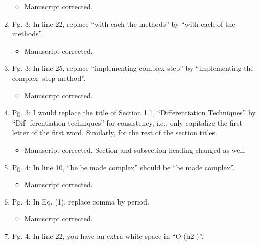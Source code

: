 \documentclass{article}
\begin{document}
\begin{enumerate}
{\color{red}  
\begin{itemize}
     \item
    Manuscript corrected.
  \end{itemize}}

 \item Pg. 3: In line 22, replace “with each the methods” by “with each of the methods”.

{\color{red}  
\begin{itemize}
     \item
 Manuscript corrected. 
  \end{itemize}}

 \item Pg. 3: In line 25, replace “implementing complex-step” by “implementing the complex-
step method”.

{\color{red}  
\begin{itemize}
     \item
 Manuscript corrected. 
  \end{itemize}}

 \item Pg. 3: I would replace the title of Section 1.1, “Differentiation Techniques” by “Dif-
ferentiation techniques” for consistency, i.e., only capitalize the ﬁrst letter of the ﬁrst
word. Similarly, for the rest of the section titles.

{\color{red}  
\begin{itemize}
     \item
 Manuscript corrected. Section and subsection heading changed as well.
  \end{itemize}}

 \item Pg. 4: In line 10, “be be made complex” should be “be made complex”.

{\color{red}  
\begin{itemize}
     \item
 Manuscript corrected. 
  \end{itemize}}

 \item Pg. 4: In Eq. (1), replace comma by period.

{\color{red}  
\begin{itemize}
     \item
 Manuscript corrected. 
  \end{itemize}}

 \item Pg. 4: In line 22, you have an extra white space in “O (h2 )”.


\end{enumerate}
\end{document}
